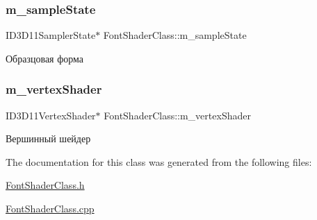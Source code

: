 \subsubsection{\texorpdfstring{m\+\_\+sample\+State}{m\_sampleState}}
{\footnotesize\ttfamily I\+D3\+D11\+Sampler\+State$\ast$ Font\+Shader\+Class\+::m\+\_\+sample\+State\hspace{0.3cm}{\ttfamily [private]}}



Образцовая форма 

\mbox{\label{class_font_shader_class_ac751ad1109a8cf0db40ebacd7ae93dbf}} 
\subsubsection{\texorpdfstring{m\+\_\+vertex\+Shader}{m\_vertexShader}}
{\footnotesize\ttfamily I\+D3\+D11\+Vertex\+Shader$\ast$ Font\+Shader\+Class\+::m\+\_\+vertex\+Shader\hspace{0.3cm}{\ttfamily [private]}}



Вершинный шейдер 



The documentation for this class was generated from the following files\+:\begin{DoxyCompactItemize}
\item 
\hyperlink{_font_shader_class_8h}{Font\+Shader\+Class.\+h}\item 
\hyperlink{_font_shader_class_8cpp}{Font\+Shader\+Class.\+cpp}\end{DoxyCompactItemize}
